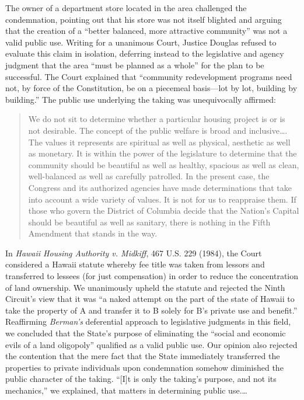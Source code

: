 The owner of a department store located in the area challenged the condemnation,
pointing out that his store was not itself blighted and arguing that the
creation of a ``better balanced, more attractive community'' was not a valid
public use. Writing for a unanimous Court, Justice Douglas refused to evaluate
this claim in isolation, deferring instead to the legislative and agency
judgment that the area ``must be planned as a whole'' for the plan to be
successful. The Court explained that ``community redevelopment programs need
not, by force of the Constitution, be on a piecemeal basis---lot by lot,
building by building.'' The public use underlying the taking was unequivocally
affirmed:
\begin{quote}
We do not sit to determine whether a particular housing project is or is not
desirable. The concept of the public welfare is broad and inclusive\ldots. The
values it represents are spiritual as well as physical, aesthetic as well as
monetary. It is within the power of the legislature to determine that the
community should be beautiful as well as healthy, spacious as well as clean,
well-balanced as well as carefully patrolled. In the present case, the Congress
and its authorized agencies have made determinations that take into account a
wide variety of values. It is not for us to reappraise them. If those who govern
the District of Columbia decide that the Nation's Capital should be beautiful as
well as sanitary, there is nothing in the Fifth Amendment that stands in the
way.
\end{quote}

In \textit{Hawaii Housing Authority v. Midkiff}, 467 U.S. 229 (1984), the Court
considered a Hawaii statute whereby fee title was taken from lessors and
transferred to lessees (for just compensation) in order to reduce the
concentration of land ownership. We unanimously upheld the statute and rejected
the Ninth Circuit's view that it was ``a naked attempt on the part of the state
of Hawaii to take the property of A and transfer it to B solely for B's private
use and benefit.'' Reaffirming \textit{Berman's} deferential approach to
legislative judgments in this field, we concluded that the State's purpose of
eliminating the ``social and economic evils of a land oligopoly'' qualified as a
valid public use. Our opinion also rejected the contention that the mere fact
that the State immediately transferred the properties to private individuals
upon condemnation somehow diminished the public character of the taking. ``[I]t
is only the taking's purpose, and not its mechanics,'' we explained, that
matters in determining public use.\ldots

